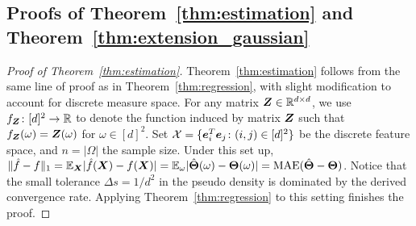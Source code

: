 \documentclass[11pt]{article}
\theoremstyle{plain}
\theoremstyle{definition}
\begin{document}
\subsection{Proofs of Theorem~\ref{thm:estimation} and Theorem~\ref{thm:extension_gaussian}}\label{sec:sub-Gaussianproof}
\begin{proof}[Proof of Theorem~\ref{thm:estimation}]
Theorem~\ref{thm:estimation} follows from the same line of proof as in Theorem~\ref{thm:regression}, with slight modification to account for discrete measure space. For any matrix $\bm Z\in\mathbb{R}^{d\times d}$, we use $f_{\bm Z}\colon[d]^2 \to \mathbb{R}$ to denote the function induced by matrix $\bm Z$ such that $f_{\bm Z}(\omega)=\bm Z(\omega)$ for $\omega\in[d]^2$. Set $\mathcal{X}=\{\bm{e}^T_i\bm{e}_j\colon(i,j)\in[d]^2\}$ be the discrete feature space, and $n=|\Omega|$ the sample size. Under this set up, $\lVert\hat f - f\rVert_1=\mathbb{E}_{\bm X}|\hat f (\bm X)- f(\bm X)| = \mathbb{E}_{\omega}|\hat {\bm{\Theta}}(\omega)-\bm{\Theta}(\omega)|=\textup{MAE}(\hat {\bm{\Theta}}-\bm{\Theta})$. Notice that the small tolerance $\Delta s=1/d^2$ in the pseudo density is dominated by the derived convergence rate. Applying Theorem~\ref{thm:regression} to this setting finishes the proof. 
\end{proof}
\end{document}
